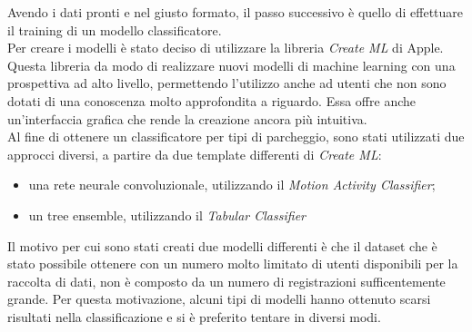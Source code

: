 Avendo i dati pronti e nel giusto formato, il passo successivo è quello di effettuare il 
training di un modello classificatore.\\
Per creare i modelli è stato deciso di utilizzare la libreria \emph{Create ML} di Apple.
Questa libreria da modo di realizzare nuovi modelli di machine learning con una prospettiva
ad alto livello, permettendo l'utilizzo anche ad utenti che non sono dotati di una conoscenza
molto approfondita a riguardo. Essa offre anche un'interfaccia grafica che rende la creazione 
ancora più intuitiva.\\
Al fine di ottenere un classificatore per tipi di parcheggio, sono stati utilizzati due 
approcci diversi, a partire da due template differenti di \emph{Create ML}:
\begin{itemize}
    \item una rete neurale convoluzionale, utilizzando il \emph{Motion Activity Classifier};
    \item un tree ensemble, utilizzando il \emph{Tabular Classifier}
\end{itemize}
Il motivo per cui sono stati creati due modelli differenti è che il dataset che è stato 
possibile ottenere con un numero molto limitato di utenti disponibili per la raccolta di 
dati, non è composto da un numero di registrazioni sufficentemente grande. Per
questa motivazione, alcuni tipi di modelli hanno ottenuto scarsi risultati nella 
classificazione e si è preferito tentare in diversi modi.


